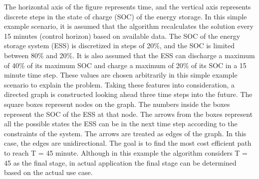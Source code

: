The horizontal axis of the figure represents time, and the vertical axis represents discrete steps in the state of charge (SOC) of the energy storage. In this simple example scenario, it is assumed that the algorithm recalculates the solution every 15 minutes (control horizon) based on available data. The SOC of the energy storage system (ESS) is discretized in steps of 20\%, and the SOC is limited between 80\% and 20\%. It is also assumed that the ESS can discharge a maximum of 40\% of its maximum SOC and charge a maximum of 20\% of its SOC in a 15 minute time step. These values are chosen arbitrarily in this simple example scenario to explain the problem. Taking these features into consideration, a directed graph is constructed looking ahead three time steps into the future. The square boxes represent nodes on the graph. The numbers inside the boxes represent the SOC of the ESS at that node. The arrows from the boxes represent all the possible states the ESS can be in the next time step according to the constraints of the system. The arrows are treated as edges of the graph. In this case, the edges are unidirectional. The goal is to find the most cost efficient path to reach T = 45 minute. Although in this example the algorithm considers T = 45 as the final stage, in actual application the final stage can be determined based on the actual use case.


